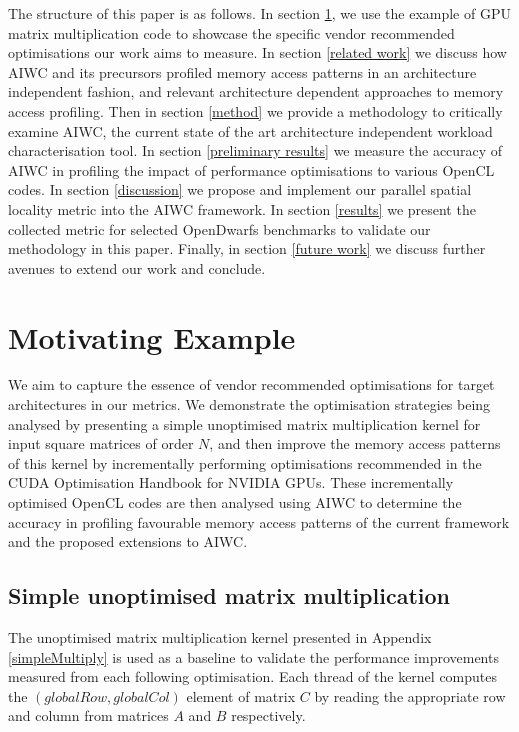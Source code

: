 \documentclass[review=false, sigchi]{acmart}
\begin{document}
	The structure of this paper is as follows. In section \ref{motivating example}, we use the example of GPU matrix multiplication code to showcase the specific vendor recommended optimisations our work aims to measure. In section \ref{related work} we discuss how AIWC and its precursors profiled memory access patterns in an architecture independent fashion, and relevant architecture dependent approaches to memory access profiling. Then in section \ref{method} we provide a methodology to critically examine AIWC, the current state of the art architecture independent workload characterisation tool. In section \ref{preliminary results} we measure the accuracy of AIWC in profiling the impact of performance optimisations to various OpenCL codes. In section \ref{discussion} we propose and implement our parallel spatial locality metric into the AIWC framework. In section \ref{results} we present the collected metric for selected OpenDwarfs benchmarks to validate our methodology in this paper. Finally, in section \ref{future work} we discuss further avenues to extend our work and conclude.
	
	\section{Motivating Example} \label{motivating example}
	
	We aim to capture the essence of vendor recommended optimisations for target architectures in our metrics. We demonstrate the optimisation strategies being analysed by presenting a simple unoptimised matrix multiplication kernel for input square matrices of order $N$, and then improve the memory access patterns of this kernel by incrementally performing optimisations recommended in the CUDA Optimisation Handbook \cite{cudaoptimisation} for NVIDIA GPUs. These incrementally optimised OpenCL codes are then analysed using AIWC to determine the accuracy in profiling favourable memory access patterns of the current framework and the proposed extensions to AIWC.
	
	\subsection{Simple unoptimised matrix multiplication}
	
	The unoptimised matrix multiplication kernel presented in Appendix \ref{simpleMultiply} is used as a baseline to validate the performance improvements measured from each following optimisation. Each thread of the kernel computes the $(globalRow, globalCol)$ element of matrix $C$ by reading the appropriate row and column from matrices $A$ and $B$ respectively.
	
\end{document}
